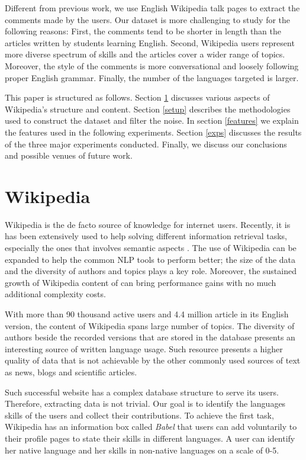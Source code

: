 \documentclass[10pt,a5paper,twoside]{article}
\begin{document}
Different from previous work, we use English Wikipedia talk pages to extract the comments made by the
users. Our dataset is more challenging to study for the following reasons:
First, the comments tend to be shorter in length than the articles written by
students learning English. Second, Wikipedia users represent more diverse
spectrum of skills and the articles cover a wider range of topics. Moreover, the
style of the comments is more conversational and loosely following proper English
grammar. Finally, the number of the languages targeted is larger.

This paper is structured as follows. Section \ref{wiki} discusses various
aspects of Wikipedia's structure and content. Section \ref{setup} describes
the methodologies used to construct the dataset and filter the noise. In section
\ref{features} we explain the features used in the following experiments.
Section \ref{exps} discusses the results of the three major experiments conducted.
Finally, we discuss our conclusions and possible venues of future work.

\section{Wikipedia}
\label{wiki}
Wikipedia is the de facto source of knowledge for internet users. Recently, it
is has been extensively used to help solving different information retrieval
tasks, especially the ones that involves semantic aspects \cite{Milne08aneffective}.
The use of Wikipedia can be expanded to help the
 common NLP tools to perform better; the size of the data and the diversity of
 authors and topics plays a key role. Moreover, the sustained growth of Wikipedia
 content of can bring performance gains with no much additional complexity costs.

With more than 90 thousand active users and 4.4 million article in its English
version, the content of Wikipedia spans large number of topics. The diversity
of authors beside the recorded versions that are stored in the database presents
an interesting source of written language usage. Such resource presents a higher quality of data that is not achievable by the other commonly used sources of text as news, blogs and scientific articles.

Such successful website has a complex database structure to serve its users.
Therefore, extracting data is not trivial. Our goal is to identify the
languages skills of the users and collect their contributions. To achieve the
first task, Wikipedia has an information box called \emph{Babel} that users can
add voluntarily to their profile pages to state their skills in different
languages. A user can identify her native language
and her skills in non-native languages on a scale of 0-5.
\end{document}
